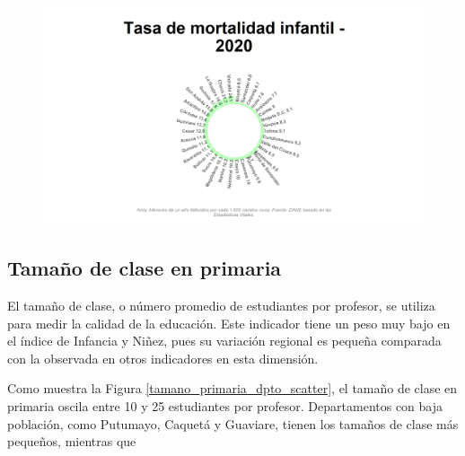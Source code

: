     \begin{figure}[H]
        \caption[Tasa de mortalidad infantil por departamentos para 2020 ]{\label{mortinf_dpto_static} }
        \begin{center}
        \includegraphics[width=\textwidth,keepaspectratio]{img/var_290_static.png}
        \end{center}
    \end{figure}


    \subsection{Tamaño de clase en primaria}

    El tamaño de clase, o número promedio de estudiantes por profesor, se utiliza para medir la calidad de la educación. Este indicador tiene un peso muy bajo en el índice de Infancia y Niñez, pues su variación regional es pequeña comparada con la observada en otros indicadores en esta dimensión. 
    
    Como muestra la Figura \ref{tamano_primaria_dpto_scatter}, el tamaño de clase en primaria oscila entre 10 y 25 estudiantes por profesor. Departamentos con baja población, como Putumayo, Caquetá y Guaviare, tienen los tamaños de clase más pequeños, mientras que   


